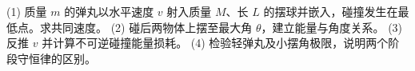 (1) 质量 \(m\) 的弹丸以水平速度 \(v\) 射入质量 \(M\)、长 \(L\) 的摆球并嵌入，碰撞发生在最低点。求共同速度。
(2) 碰后两物体上摆至最大角 \(\theta\)，建立能量与角度关系。
(3) 反推 \(v\) 并计算不可逆碰撞能量损耗。
(4) 检验轻弹丸及小摆角极限，说明两个阶段守恒律的区别。
